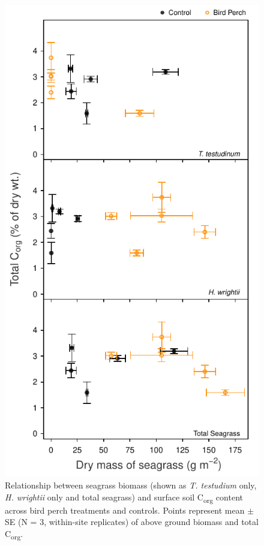 \begin{figure}
  \centering
  \includegraphics[width=.70\textwidth]{Figures/chapter1/fig9}
\caption[Relationship between seagrass biomass (shown as \textit{T. testudium} only, \textit{H. wrightii} only and total seagrass) and surface soil C\textsubscript{org} content across bird perch treatments and controls. Points represent mean $\pm$ SE (N = 3, within-site replicates) of above ground biomass and total C\textsubscript{org}]{Relationship between seagrass biomass (shown as \textit{T. testudium} only, \textit{H. wrightii} only and total seagrass) and surface soil C\textsubscript{org} content across bird perch treatments and controls. Points represent mean $\pm$ SE (N = 3, within-site replicates) of above ground biomass and total C\textsubscript{org}.}
  \label{fig:1fig9}
\end{figure}


